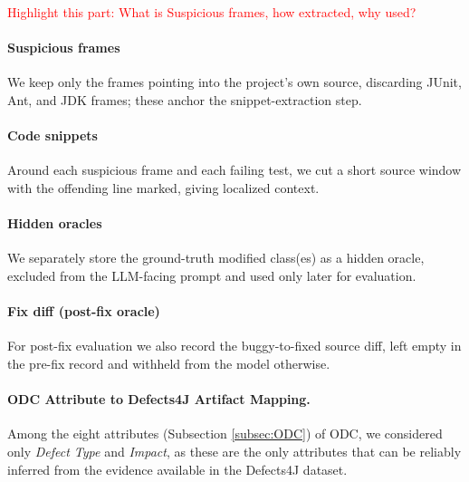 \textcolor{red}{Highlight this part: What is Suspicious frames, how extracted, why used?}
\paragraph{Suspicious frames}
We keep only the frames pointing into the project's own source, discarding
JUnit, Ant, and JDK frames; these anchor the snippet-extraction step.

\paragraph{Code snippets}
Around each suspicious frame and each failing test, we cut a short source
window with the offending line marked, giving localized context.

\paragraph{Hidden oracles}
We separately store the ground-truth modified class(es) as a hidden oracle,
excluded from the LLM-facing prompt and used only later for evaluation.

\paragraph{Fix diff (post-fix oracle)}
For post-fix evaluation we also record the buggy-to-fixed source diff, left
empty in the pre-fix record and withheld from the model otherwise.


\paragraph{ODC Attribute to Defects4J Artifact  Mapping.}
Among the eight attributes (Subsection \ref{subsec:ODC}) of ODC, we considered only \textit{Defect Type} and \textit{Impact}, as these are the only attributes that can be reliably inferred from the evidence available in the Defects4J dataset. 

